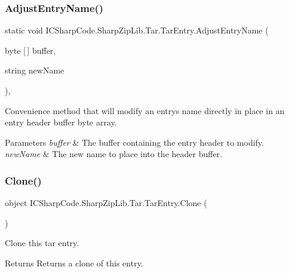\subsubsection{\texorpdfstring{Adjust\+Entry\+Name()}{AdjustEntryName()}}
{\footnotesize\ttfamily static void I\+C\+Sharp\+Code.\+Sharp\+Zip\+Lib.\+Tar.\+Tar\+Entry.\+Adjust\+Entry\+Name (\begin{DoxyParamCaption}\item[{byte \mbox{[}$\,$\mbox{]}}]{buffer,  }\item[{string}]{new\+Name }\end{DoxyParamCaption})\hspace{0.3cm}{\ttfamily [inline]}, {\ttfamily [static]}}



Convenience method that will modify an entry\textquotesingle{}s name directly in place in an entry header buffer byte array. 


\begin{DoxyParams}{Parameters}
{\em buffer} & The buffer containing the entry header to modify. \\
\hline
{\em new\+Name} & The new name to place into the header buffer. \\
\hline
\end{DoxyParams}
\mbox{\label{class_i_c_sharp_code_1_1_sharp_zip_lib_1_1_tar_1_1_tar_entry_a57cc33b32d0a8bd13b53610f77465bf0}} 
\subsubsection{\texorpdfstring{Clone()}{Clone()}}
{\footnotesize\ttfamily object I\+C\+Sharp\+Code.\+Sharp\+Zip\+Lib.\+Tar.\+Tar\+Entry.\+Clone (\begin{DoxyParamCaption}{ }\end{DoxyParamCaption})\hspace{0.3cm}{\ttfamily [inline]}}



Clone this tar entry. 

\begin{DoxyReturn}{Returns}
Returns a clone of this entry.
\end{DoxyReturn}
\mbox{\label{class_i_c_sharp_code_1_1_sharp_zip_lib_1_1_tar_1_1_tar_entry_aad043c4b4c6060f03f8be4ff49784b2a}} 
